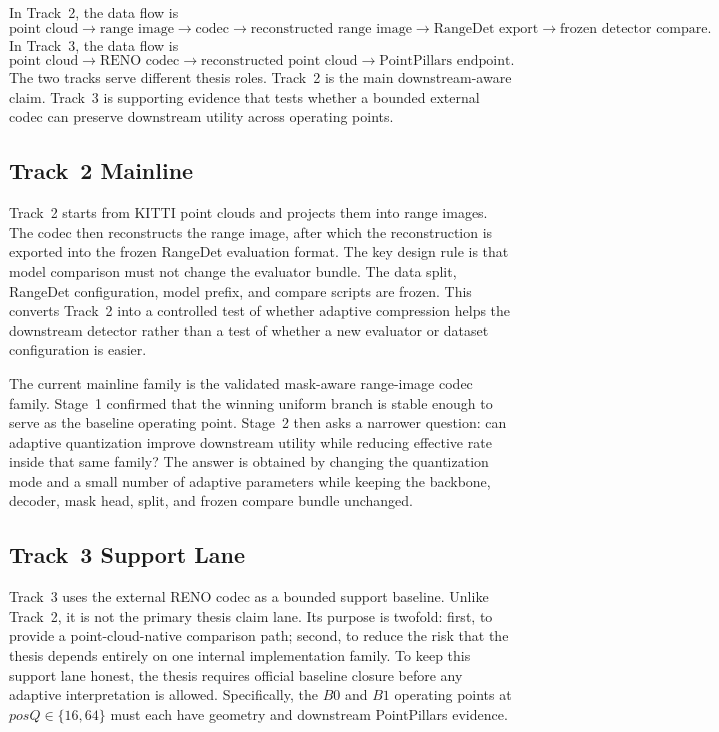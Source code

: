 In Track~2, the data flow is
\begin{equation}
\text{point cloud} \rightarrow \text{range image} \rightarrow \text{codec} \rightarrow \text{reconstructed range image} \rightarrow \text{RangeDet export} \rightarrow \text{frozen detector compare}.
\end{equation}
In Track~3, the data flow is
\begin{equation}
\text{point cloud} \rightarrow \text{RENO codec} \rightarrow \text{reconstructed point cloud} \rightarrow \text{PointPillars endpoint}.
\end{equation}
The two tracks serve different thesis roles. Track~2 is the main downstream-aware claim. Track~3 is supporting evidence that tests whether a bounded external codec can preserve downstream utility across operating points.

\subsection{Track~2 Mainline}
Track~2 starts from KITTI point clouds and projects them into range images. The codec then reconstructs the range image, after which the reconstruction is exported into the frozen RangeDet evaluation format. The key design rule is that model comparison must not change the evaluator bundle. The data split, RangeDet configuration, model prefix, and compare scripts are frozen. This converts Track~2 into a controlled test of whether adaptive compression helps the downstream detector rather than a test of whether a new evaluator or dataset configuration is easier.

The current mainline family is the validated mask-aware range-image codec family. Stage~1 confirmed that the winning uniform branch is stable enough to serve as the baseline operating point. Stage~2 then asks a narrower question: can adaptive quantization improve downstream utility while reducing effective rate inside that same family? The answer is obtained by changing the quantization mode and a small number of adaptive parameters while keeping the backbone, decoder, mask head, split, and frozen compare bundle unchanged.

\subsection{Track~3 Support Lane}
Track~3 uses the external RENO codec as a bounded support baseline. Unlike Track~2, it is not the primary thesis claim lane. Its purpose is twofold: first, to provide a point-cloud-native comparison path; second, to reduce the risk that the thesis depends entirely on one internal implementation family. To keep this support lane honest, the thesis requires official baseline closure before any adaptive interpretation is allowed. Specifically, the \(B0\) and \(B1\) operating points at \(posQ\in\{16,64\}\) must each have geometry and downstream PointPillars evidence.

